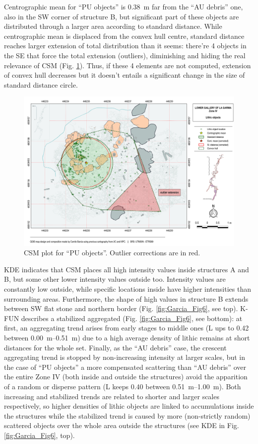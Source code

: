 Centrographic mean for “PU objects” is \SI{0.38}{\metre} far from the “AU debris” one, also in the SW corner of structure B, but significant part of these objects are distributed through a larger area according to standard distance. While centrographic mean is displaced from the convex hull centre, standard distance reaches larger extension of total distribution than it seems: there’re 4 objects in the SE that force the total extension (outliers), diminishing and hiding the real relevance of CSM (Fig. \ref{fig:Garcia_Fig5}). Thus, if these 4 elements are not computed, extension of convex hull decreases but it doesn’t entails a significant change in the size of standard distance circle.

\begin{figure}
	\includegraphics[width=\linewidth]{figures/garcia_Fig5}
	\centering
	\caption{CSM plot for “PU objects”. Outlier corrections are in red.}
	\label{fig:Garcia_Fig5}
\end{figure}

KDE indicates that CSM places all high intensity values inside structures A and B, but some other lower intensity values outside too. Intensity values are constantly low outside, while specific locations inside have higher intensities than surrounding areas. Furthermore, the shape of high values in structure B extends between SW flat stone and northern border (Fig. \ref{fig:Garcia_Fig6}, see top). K-FUN describes a stabilized aggregated (Fig. \ref{fig:Garcia_Fig6}, see bottom): at first, an aggregating trend arises from early stages to middle ones (L ups to 0.42 between \SIrange{0.00}{0.51}{\metre}) due to a high average density of lithic remains at short distances for the whole set. Finally, as the “AU debris” case, the crescent aggregating trend is stopped by non-increasing intensity at larger scales, but in the case of “PU objects” a more compensated scattering than “AU debris” over the entire Zone IV (both inside and outside the structures) avoid the apparition of a random or disperse pattern (L keeps 0.40 between \SIrange{0.51}{1.00}{\metre}). Both increasing and stabilized trends are related to shorter and larger scales respectively, so higher densities of lithic objects are linked to accumulations inside the structures while the stabilized trend is caused by more (non-strictly random) scattered objects over the whole area outside the structures (see KDE in Fig. \ref{fig:Garcia_Fig6}, top).

